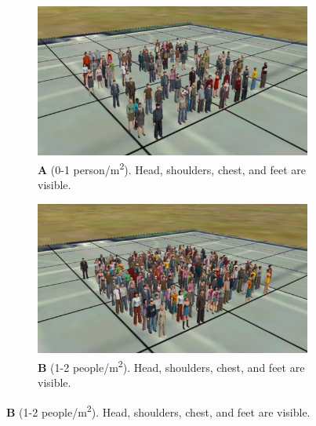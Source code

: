 \begin{figure}
  \centering
  \begin{subfigure}[t]{0.45\textwidth}
    \centering
    \includegraphics[width=\textwidth]{Pictures/Figures/Los/A.png}
    \caption*{\textbf{A} (0-1 person/m\textsuperscript{2}). Head, shoulders, chest, and feet are visible.}
  \end{subfigure}%
  \hspace{0.06\textwidth}
  \begin{subfigure}[t]{0.45\textwidth}
    \centering
    \includegraphics[width=\textwidth]{Pictures/Figures/Los/B.png}
    \caption*{\textbf{B} (1-2 people/m\textsuperscript{2}). Head, shoulders, chest, and feet are visible.}
  \end{subfigure}


\end{figure}
